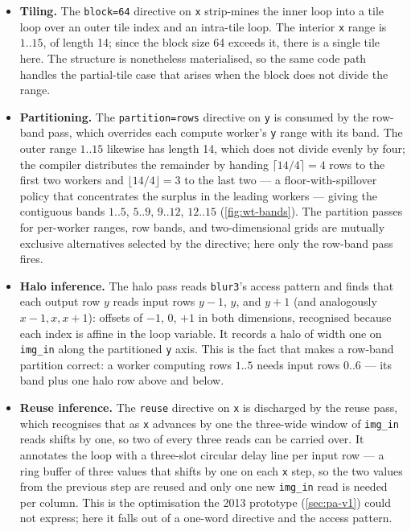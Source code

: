 \begin{itemize}
  \item \textbf{Tiling.} The \texttt{block=64} directive on \texttt{x} strip-mines
        the inner loop into a tile loop over an outer tile index and an intra-tile
        loop. The interior \texttt{x} range is $1..15$, of length 14; since the
        block size 64 exceeds it, there is a single tile here. The structure is
        nonetheless materialised, so the same code path handles the partial-tile
        case that arises when the block does not divide the range.
  \item \textbf{Partitioning.} The \texttt{partition=rows} directive on \texttt{y}
        is consumed by the row-band pass, which overrides each compute worker's
        \texttt{y} range with its band. The outer range $1..15$ likewise has length
        14, which does not divide evenly by four; the compiler distributes the
        remainder by handing
        $\lceil 14/4 \rceil = 4$ rows to the first two workers and
        $\lfloor 14/4 \rfloor = 3$ to the last two --- a floor-with-spillover policy
        that concentrates the surplus in the leading workers --- giving the contiguous bands
        $1..5$, $5..9$, $9..12$, $12..15$ (\cref{fig:wt-bands}). The partition passes for
        per-worker ranges, row bands, and two-dimensional grids are mutually
        exclusive alternatives selected by the directive; here only the row-band
        pass fires.
  \item \textbf{Halo inference.} The halo pass reads \texttt{blur3}'s access
        pattern and finds that each output row $y$ reads input rows $y-1$, $y$, and
        $y+1$ (and analogously $x-1, x, x+1$): offsets of $-1$, $0$, $+1$ in both
        dimensions, recognised because each index is affine in the loop variable.
        It records a halo of width one on \texttt{img\_in} along the partitioned
        \texttt{y} axis. This is the fact that makes a row-band partition correct:
        a worker computing rows $1..5$ needs input rows $0..6$ --- its band plus one
        halo row above and below.
  \item \textbf{Reuse inference.} The \texttt{reuse} directive on \texttt{x} is
        discharged by the reuse pass, which recognises that as \texttt{x} advances
        by one the three-wide window of \texttt{img\_in} reads shifts by one, so two
        of every three reads can be carried over. It annotates the loop with a
        three-slot circular delay line per input row --- a ring buffer of three
        values that shifts by one on each \texttt{x} step, so the two values from the
        previous step are reused and only one new \texttt{img\_in} read is needed per
        column. This is the optimisation the 2013 prototype (\cref{sec:pa-v1})
        could not express; here it falls out of a
        one-word directive and the access pattern.
\end{itemize}


